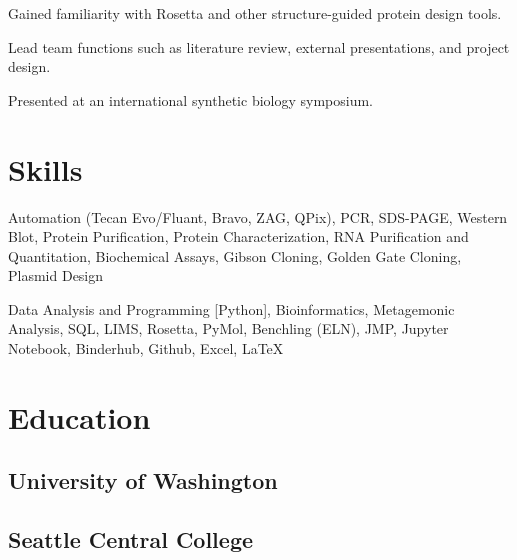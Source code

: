 \documentclass[]{forrest-resume-interfont}
\begin{document}
\begin{tightemize}
    \item Gained familiarity with Rosetta and other structure-guided protein design tools.
    \item Lead team functions such as literature review, external presentations, and project design.
    \item Presented at an international synthetic biology symposium.
\end{tightemize}
\spacesep
\linesep
\spacesep


\section{ Skills}
Automation (Tecan Evo/Fluant, Bravo, ZAG, QPix),
PCR,
SDS-PAGE,
Western Blot,
Protein Purification,
Protein Characterization,
RNA Purification and Quantitation,
Biochemical Assays,
Gibson Cloning,
Golden Gate Cloning,
Plasmid Design

\spacesep

Data Analysis and Programming [Python],
Bioinformatics,
Metagemonic Analysis,
SQL,
LIMS,
Rosetta,
PyMol,
Benchling (ELN),
JMP,
Jupyter Notebook,
Binderhub,
Github,
Excel,
LaTeX
\spacesep
\linesep
\spacesep


\section{ Education}
\subsection{University of Washington}
\spacesep
\subsection{Seattle Central College}

\vfill

\noindent\makebox[\linewidth]{\color{black}\rule{\paperwidth}{0.4pt}}
\end{document}
